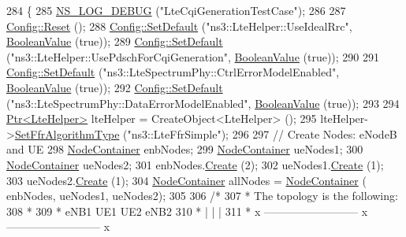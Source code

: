 \begin{DoxyCode}
284 \{
285   \hyperlink{group__logging_ga413f1886406d49f59a6a0a89b77b4d0a}{NS\_LOG\_DEBUG} (\textcolor{stringliteral}{"LteCqiGenerationTestCase"});
286 
287   \hyperlink{group__config_ga2c1b65724f42f8c72276d7e7ad6df6db}{Config::Reset} ();
288   \hyperlink{group__config_ga2e7882df849d8ba4aaad31c934c40c06}{Config::SetDefault} (\textcolor{stringliteral}{"ns3::LteHelper::UseIdealRrc"}, 
      \hyperlink{classns3_1_1BooleanValue}{BooleanValue} (\textcolor{keyword}{true}));
289   \hyperlink{group__config_ga2e7882df849d8ba4aaad31c934c40c06}{Config::SetDefault} (\textcolor{stringliteral}{"ns3::LteHelper::UsePdschForCqiGeneration"}, 
      \hyperlink{classns3_1_1BooleanValue}{BooleanValue} (\textcolor{keyword}{true}));
290 
291   \hyperlink{group__config_ga2e7882df849d8ba4aaad31c934c40c06}{Config::SetDefault} (\textcolor{stringliteral}{"ns3::LteSpectrumPhy::CtrlErrorModelEnabled"}, 
      \hyperlink{classns3_1_1BooleanValue}{BooleanValue} (\textcolor{keyword}{true}));
292   \hyperlink{group__config_ga2e7882df849d8ba4aaad31c934c40c06}{Config::SetDefault} (\textcolor{stringliteral}{"ns3::LteSpectrumPhy::DataErrorModelEnabled"}, 
      \hyperlink{classns3_1_1BooleanValue}{BooleanValue} (\textcolor{keyword}{true}));
293 
294   \hyperlink{classns3_1_1Ptr}{Ptr<LteHelper>} lteHelper = CreateObject<LteHelper> ();
295   lteHelper->\hyperlink{classns3_1_1LteHelper_a035c6b03305c1511975362f80425b5fc}{SetFfrAlgorithmType} (\textcolor{stringliteral}{"ns3::LteFfrSimple"});
296 
297   \textcolor{comment}{// Create Nodes: eNodeB and UE}
298   \hyperlink{classns3_1_1NodeContainer}{NodeContainer} enbNodes;
299   \hyperlink{classns3_1_1NodeContainer}{NodeContainer} ueNodes1;
300   \hyperlink{classns3_1_1NodeContainer}{NodeContainer} ueNodes2;
301   enbNodes.\hyperlink{classns3_1_1NodeContainer_a787f059e2813e8b951cc6914d11dfe69}{Create} (2);
302   ueNodes1.\hyperlink{classns3_1_1NodeContainer_a787f059e2813e8b951cc6914d11dfe69}{Create} (1);
303   ueNodes2.\hyperlink{classns3_1_1NodeContainer_a787f059e2813e8b951cc6914d11dfe69}{Create} (1);
304   \hyperlink{classns3_1_1NodeContainer}{NodeContainer} allNodes = \hyperlink{classns3_1_1NodeContainer}{NodeContainer} ( enbNodes, ueNodes1, ueNodes2);
305 
306   \textcolor{comment}{/*}
307 \textcolor{comment}{   * The topology is the following:}
308 \textcolor{comment}{   *}
309 \textcolor{comment}{   *  eNB1                        UE1 UE2                        eNB2}
310 \textcolor{comment}{   *    |                            |                            |}
311 \textcolor{comment}{   *    x -------------------------- x -------------------------- x}

\end{DoxyCode}
